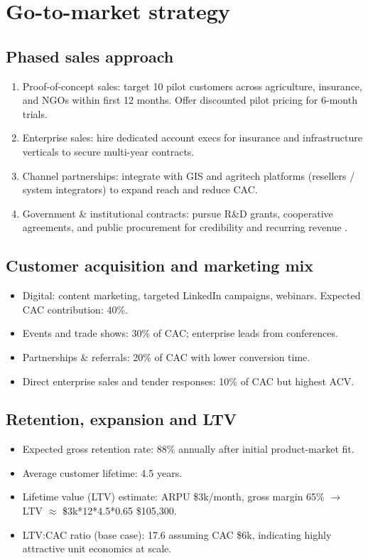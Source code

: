 \section{Go-to-market strategy}
\subsection{Phased sales approach}
\begin{enumerate}
  \item Proof-of-concept sales: target 10 pilot customers across agriculture, insurance, and NGOs within first 12 months. Offer discounted pilot pricing for 6-month trials.
  \item Enterprise sales: hire dedicated account execs for insurance and infrastructure verticals to secure multi-year contracts.
  \item Channel partnerships: integrate with GIS and agritech platforms (resellers / system integrators) to expand reach and reduce CAC.
  \item Government \& institutional contracts: pursue R\&D grants, cooperative agreements, and public procurement for credibility and recurring revenue \parencite{nasa_commercial}.
\end{enumerate}

\subsection{Customer acquisition and marketing mix}
\begin{itemize}
  \item Digital: content marketing, targeted LinkedIn campaigns, webinars. Expected CAC contribution: 40\%.
  \item Events and trade shows: 30\% of CAC; enterprise leads from conferences.
  \item Partnerships \& referrals: 20\% of CAC with lower conversion time.
  \item Direct enterprise sales and tender responses: 10\% of CAC but highest ACV.
\end{itemize}

\subsection{Retention, expansion and LTV}
\begin{itemize}
  \item Expected gross retention rate: 88\% annually after initial product-market fit.
  \item Average customer lifetime: 4.5 years.
  \item Lifetime value (LTV) estimate: ARPU \$3k/month, gross margin 65\% $\rightarrow$ LTV $\approx$ \$3k*12*4.5*0.65 \approx \$105,300.
  \item LTV:CAC ratio (base case): \num{17.6} assuming CAC \$6k, indicating highly attractive unit economics at scale.
\end{itemize}

